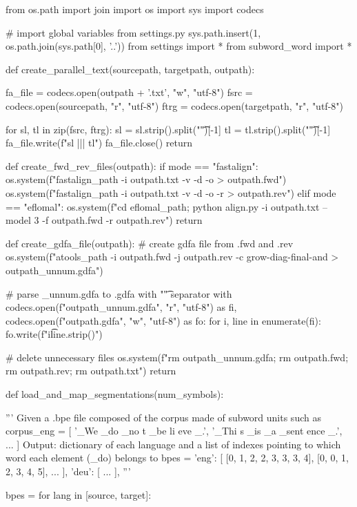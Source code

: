\begin{python}
from os.path import join
import os
import sys
import codecs

# import global variables from settings.py
sys.path.insert(1, os.path.join(sys.path[0], '..'))
from settings import *
from subword_word import *


def create_parallel_text(sourcepath, targetpath, outpath):

  fa_file = codecs.open(outpath + '.txt', "w", "utf-8")
  fsrc = codecs.open(sourcepath, "r", "utf-8")
  ftrg = codecs.open(targetpath, "r", "utf-8")

  for sl, tl in zip(fsrc, ftrg):
    sl = sl.strip().split("\t")[-1]
    tl = tl.strip().split("\t")[-1]
    fa_file.write(f"{sl} ||| {tl}\n")
  fa_file.close()
  return


def create_fwd_rev_files(outpath):
  if mode == "fastalign":
    os.system(f"{fastalign_path} -i {outpath}.txt -v -d -o > {outpath}.fwd")
    os.system(f"{fastalign_path} -i {outpath}.txt -v -d -o -r > {outpath}.rev")
  elif mode == "eflomal":
    os.system(f"cd {eflomal_path}; python align.py -i {outpath}.txt --model 3 -f {outpath}.fwd -r {outpath}.rev")
  return


def create_gdfa_file(outpath):
  # create gdfa file from .fwd and .rev
  os.system(f"{atools_path} -i {outpath}.fwd -j {outpath}.rev -c grow-diag-final-and > {outpath}_unnum.gdfa")

  # parse _unnum.gdfa to .gdfa with "\t" separator
  with codecs.open(f"{outpath}_unnum.gdfa", "r", "utf-8") as fi, codecs.open(f"{outpath}.gdfa", "w", "utf-8") as fo:
    for i, line in enumerate(fi):
      fo.write(f"{i}\t{line.strip()}\n")

  # delete unnecessary files
  os.system(f"rm {outpath}_unnum.gdfa; rm {outpath}.fwd; rm {outpath}.rev; rm {outpath}.txt")
  return


def load_and_map_segmentations(num_symbols):

    '''
    Given a .bpe file composed of the corpus made of subword units such as
    corpus_eng =  [
        '_We _do _no t _be li eve _.',
        '_Thi s _is _a _sent ence _.',
        ...
    ]
    Output: dictionary of each language and 
    a list of indexes pointing to which word each element (_do) belongs to
    bpes = {
        'eng':
        [
            [0, 1, 2, 2, 3, 3, 3, 4],
            [0, 0, 1, 2, 3, 4, 5],
            ...
        ],
        'deu':
        [
            ...
        ],
    } 
    '''

    bpes = {}
    for lang in [source, target]:


\end{python}

